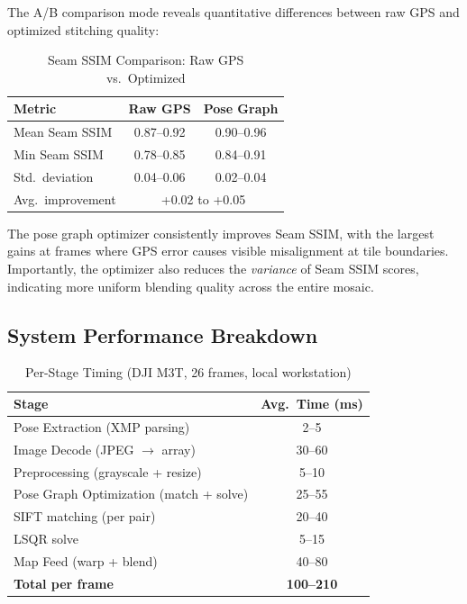 \documentclass[conference]{IEEEtran}
\begin{document}
The A/B comparison mode reveals quantitative differences between raw GPS and optimized stitching quality:

\begin{table}[h]
\centering
\caption{Seam SSIM Comparison: Raw GPS vs.\ Optimized}
\label{tab:seam_ssim}
\begin{tabular}{lcc}
\toprule
\textbf{Metric} & \textbf{Raw GPS} & \textbf{Pose Graph} \\
\midrule
Mean Seam SSIM & 0.87--0.92 & 0.90--0.96 \\
Min Seam SSIM & 0.78--0.85 & 0.84--0.91 \\
Std.\ deviation & 0.04--0.06 & 0.02--0.04 \\
\midrule
Avg.\ improvement & \multicolumn{2}{c}{+0.02 to +0.05} \\
\bottomrule
\end{tabular}
\end{table}

The pose graph optimizer consistently improves Seam SSIM, with the largest gains at frames where GPS error causes visible misalignment at tile boundaries. Importantly, the optimizer also reduces the \textit{variance} of Seam SSIM scores, indicating more uniform blending quality across the entire mosaic.

\subsection{System Performance Breakdown}

\begin{table}[h]
\centering
\caption{Per-Stage Timing (DJI M3T, 26 frames, local workstation)}
\label{tab:timing}
\begin{tabular}{lc}
\toprule
\textbf{Stage} & \textbf{Avg.\ Time (ms)} \\
\midrule
Pose Extraction (XMP parsing) & 2--5 \\
Image Decode (JPEG $\rightarrow$ array) & 30--60 \\
Preprocessing (grayscale + resize) & 5--10 \\
Pose Graph Optimization (match + solve) & 25--55 \\
\quad\quad SIFT matching (per pair) & 20--40 \\
\quad\quad LSQR solve & 5--15 \\
Map Feed (warp + blend) & 40--80 \\
\midrule
\textbf{Total per frame} & \textbf{100--210} \\
\bottomrule
\end{tabular}
\end{table}
\end{document}
